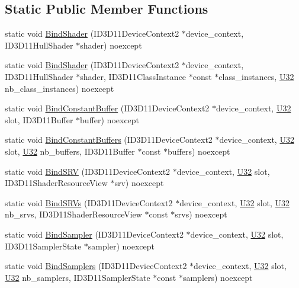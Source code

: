 \subsection*{Static Public Member Functions}
\begin{DoxyCompactItemize}
\item 
static void \hyperlink{structmage_1_1_pipeline_1_1_h_s_aeda172e8c7287a8aa34d96508a378e90}{Bind\+Shader} (I\+D3\+D11\+Device\+Context2 $\ast$device\+\_\+context, I\+D3\+D11\+Hull\+Shader $\ast$shader) noexcept
\item 
static void \hyperlink{structmage_1_1_pipeline_1_1_h_s_a1b5d2e7962ca4b72d61fb59b7b8356a3}{Bind\+Shader} (I\+D3\+D11\+Device\+Context2 $\ast$device\+\_\+context, I\+D3\+D11\+Hull\+Shader $\ast$shader, I\+D3\+D11\+Class\+Instance $\ast$const $\ast$class\+\_\+instances, \hyperlink{namespacemage_a41c104c036fba3756a74e19f793eeaa1}{U32} nb\+\_\+class\+\_\+instances) noexcept
\item 
static void \hyperlink{structmage_1_1_pipeline_1_1_h_s_a4a40b9988797a1d0b59b85fa1091dc63}{Bind\+Constant\+Buffer} (I\+D3\+D11\+Device\+Context2 $\ast$device\+\_\+context, \hyperlink{namespacemage_a41c104c036fba3756a74e19f793eeaa1}{U32} slot, I\+D3\+D11\+Buffer $\ast$buffer) noexcept
\item 
static void \hyperlink{structmage_1_1_pipeline_1_1_h_s_a72e19720b4b80196452f82391c08e5dc}{Bind\+Constant\+Buffers} (I\+D3\+D11\+Device\+Context2 $\ast$device\+\_\+context, \hyperlink{namespacemage_a41c104c036fba3756a74e19f793eeaa1}{U32} slot, \hyperlink{namespacemage_a41c104c036fba3756a74e19f793eeaa1}{U32} nb\+\_\+buffers, I\+D3\+D11\+Buffer $\ast$const $\ast$buffers) noexcept
\item 
static void \hyperlink{structmage_1_1_pipeline_1_1_h_s_a33576c6d56f853919b0aab87ecd7fbd9}{Bind\+S\+RV} (I\+D3\+D11\+Device\+Context2 $\ast$device\+\_\+context, \hyperlink{namespacemage_a41c104c036fba3756a74e19f793eeaa1}{U32} slot, I\+D3\+D11\+Shader\+Resource\+View $\ast$srv) noexcept
\item 
static void \hyperlink{structmage_1_1_pipeline_1_1_h_s_a6a387ee3245b112b7dfada64f8c9417f}{Bind\+S\+R\+Vs} (I\+D3\+D11\+Device\+Context2 $\ast$device\+\_\+context, \hyperlink{namespacemage_a41c104c036fba3756a74e19f793eeaa1}{U32} slot, \hyperlink{namespacemage_a41c104c036fba3756a74e19f793eeaa1}{U32} nb\+\_\+srvs, I\+D3\+D11\+Shader\+Resource\+View $\ast$const $\ast$srvs) noexcept
\item 
static void \hyperlink{structmage_1_1_pipeline_1_1_h_s_a0d0e342ca388faf5cc637a3e41642b04}{Bind\+Sampler} (I\+D3\+D11\+Device\+Context2 $\ast$device\+\_\+context, \hyperlink{namespacemage_a41c104c036fba3756a74e19f793eeaa1}{U32} slot, I\+D3\+D11\+Sampler\+State $\ast$sampler) noexcept
\item 
static void \hyperlink{structmage_1_1_pipeline_1_1_h_s_a4764408505d1fac907253183b4a8e0f1}{Bind\+Samplers} (I\+D3\+D11\+Device\+Context2 $\ast$device\+\_\+context, \hyperlink{namespacemage_a41c104c036fba3756a74e19f793eeaa1}{U32} slot, \hyperlink{namespacemage_a41c104c036fba3756a74e19f793eeaa1}{U32} nb\+\_\+samplers, I\+D3\+D11\+Sampler\+State $\ast$const $\ast$samplers) noexcept
\end{DoxyCompactItemize}
